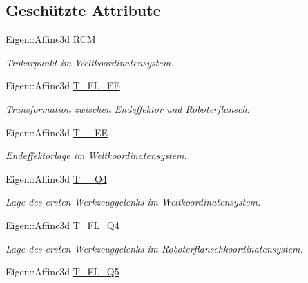 \subsection*{Geschützte Attribute}
\begin{DoxyCompactItemize}
\item 
\hypertarget{classIKinematic_a8aba9e0c27fc5f01b8eb93fa8afaf641}{Eigen\-::\-Affine3d \hyperlink{classIKinematic_a8aba9e0c27fc5f01b8eb93fa8afaf641}{R\-C\-M}}\label{classIKinematic_a8aba9e0c27fc5f01b8eb93fa8afaf641}

\begin{DoxyCompactList}\small\item\em Trokarpunkt im Weltkoordinatensystem. \end{DoxyCompactList}\item 
\hypertarget{classIKinematic_a04a66e41cfd8be035734e5c738df90e0}{Eigen\-::\-Affine3d \hyperlink{classIKinematic_a04a66e41cfd8be035734e5c738df90e0}{T\-\_\-\-F\-L\-\_\-\-E\-E}}\label{classIKinematic_a04a66e41cfd8be035734e5c738df90e0}

\begin{DoxyCompactList}\small\item\em Transformation zwischen Endeffektor und Roboterflansch. \end{DoxyCompactList}\item 
\hypertarget{classIKinematic_a1c0a95317992b7fcaf26ab2bf9aaf3de}{Eigen\-::\-Affine3d \hyperlink{classIKinematic_a1c0a95317992b7fcaf26ab2bf9aaf3de}{T\-\_\-\_\-\-E\-E}}\label{classIKinematic_a1c0a95317992b7fcaf26ab2bf9aaf3de}

\begin{DoxyCompactList}\small\item\em Endeffektorlage im Weltkoordinatensystem. \end{DoxyCompactList}\item 
Eigen\-::\-Affine3d \hyperlink{classIKinematic_a0f3ae85bd946533cf8a22120f597ab00}{T\-\_\-\_\-\-Q4}
\begin{DoxyCompactList}\small\item\em Lage des ersten Werkzeuggelenks im Weltkoordinatensystem. \end{DoxyCompactList}\item 
\hypertarget{classIKinematic_a45621d4e095f5b5ebd6b9eeae160e9fa}{Eigen\-::\-Affine3d \hyperlink{classIKinematic_a45621d4e095f5b5ebd6b9eeae160e9fa}{T\-\_\-\-F\-L\-\_\-\-Q4}}\label{classIKinematic_a45621d4e095f5b5ebd6b9eeae160e9fa}

\begin{DoxyCompactList}\small\item\em Lage des ersten Werkzeuggelenks im Roboterflanschkoordinatensystem. \end{DoxyCompactList}\item 
\hypertarget{classIKinematic_a40a738da633f12f257eb3e9f925cd00b}{Eigen\-::\-Affine3d \hyperlink{classIKinematic_a40a738da633f12f257eb3e9f925cd00b}{T\-\_\-\-F\-L\-\_\-\-Q5}}\label{classIKinematic_a40a738da633f12f257eb3e9f925cd00b}


\end{DoxyCompactItemize}
